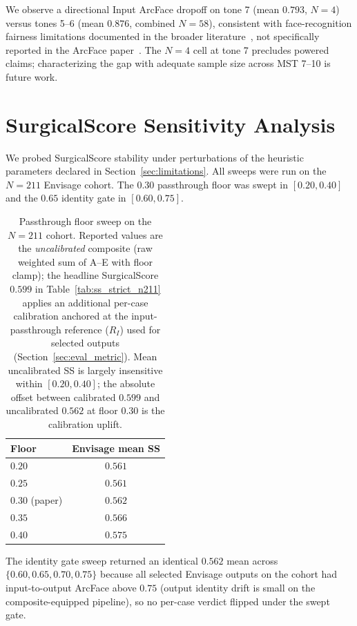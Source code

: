\documentclass{article}
\newcommand{\method}{Envisage}
\begin{document}
We observe a directional Input ArcFace dropoff on tone 7 (mean $0.793$, $N{=}4$) versus tones 5--6 (mean $0.876$, combined $N{=}58$), consistent with face-recognition fairness limitations documented in the broader literature~\citep{buolamwini2018gender}, not specifically reported in the ArcFace paper~\citep{deng2019arcface}. The $N{=}4$ cell at tone 7 precludes powered claims; characterizing the gap with adequate sample size across MST 7--10 is future work.

\section{SurgicalScore Sensitivity Analysis}
\label{app:sensitivity}

We probed SurgicalScore stability under perturbations of the heuristic
parameters declared in Section~\ref{sec:limitations}. All sweeps were run on
the $N{=}211$ \method{} cohort. The $0.30$ passthrough floor was swept
in $[0.20, 0.40]$ and the $0.65$ identity gate in $[0.60, 0.75]$.

\begin{table}[h]
\centering
\small
\caption{Passthrough floor sweep on the $N{=}211$ cohort. Reported values
are the \emph{uncalibrated} composite (raw weighted sum of A--E with floor
clamp); the headline SurgicalScore $0.599$ in Table~\ref{tab:ss_strict_n211}
applies an additional per-case calibration anchored at the input-passthrough
reference ($R_I$) used for selected outputs (Section~\ref{sec:eval_metric}).
Mean uncalibrated SS is largely insensitive within $[0.20, 0.40]$; the absolute
offset between calibrated $0.599$ and uncalibrated $0.562$ at floor $0.30$ is
the calibration uplift.}
\label{tab:floor_sweep}
\begin{tabular}{@{}lc@{}}
\toprule
\textbf{Floor} & \textbf{Envisage mean SS} \\
\midrule
$0.20$ & $0.561$ \\
$0.25$ & $0.561$ \\
$0.30$ (paper) & $0.562$ \\
$0.35$ & $0.566$ \\
$0.40$ & $0.575$ \\
\bottomrule
\end{tabular}
\end{table}

The identity gate sweep returned an identical $0.562$ mean across $\{0.60,
0.65, 0.70, 0.75\}$ because all selected \method{} outputs on the
cohort had input-to-output ArcFace above $0.75$ (output identity drift is
small on the composite-equipped pipeline), so no per-case verdict flipped
under the swept gate.
\end{document}
